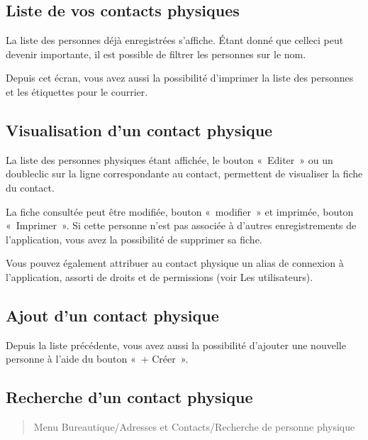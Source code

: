 \documentclass[a4paper,10pt,oneside,french]{sphinxmanual}
\begin{document}
\subsection{Liste de vos contacts physiques}
\label{\detokenize{contacts/individual:liste-de-vos-contacts-physiques}}
La liste des personnes déjà enregistrées s’affiche. Étant donné que celle\sphinxhyphen{}ci peut devenir importante, il est possible de filtrer les personnes sur le nom.

Depuis cet écran, vous avez aussi la possibilité d’imprimer la liste des personnes et les étiquettes pour le courrier.

\noindent{}


\subsection{Visualisation d’un contact physique}
\label{\detokenize{contacts/individual:visualisation-d-un-contact-physique}}
La liste des personnes physiques étant affichée, le bouton « Editer » ou un double\sphinxhyphen{}clic sur la ligne correspondante au contact, permettent de visualiser la fiche du contact.

\noindent{}

La fiche consultée peut être modifiée, bouton « modifier » et imprimée, bouton « Imprimer ».
Si cette personne n’est pas associée à d’autres enregistrements de l’application, vous avez la possibilité de supprimer sa fiche.

Vous pouvez également attribuer au contact physique un alias de connexion à l’application, assorti de droits et de permissions (voir Les utilisateurs).

\noindent{}


\subsection{Ajout d’un contact physique}
\label{\detokenize{contacts/individual:ajout-d-un-contact-physique}}
Depuis la liste précédente, vous avez aussi la possibilité d’ajouter une nouvelle personne à l’aide du bouton « + Créer ».

\noindent{}


\subsection{Recherche d’un contact physique}
\label{\detokenize{contacts/individual:recherche-d-un-contact-physique}}\begin{quote}

Menu Bureautique/Adresses et Contacts/Recherche de personne physique
\end{quote}
\end{document}
